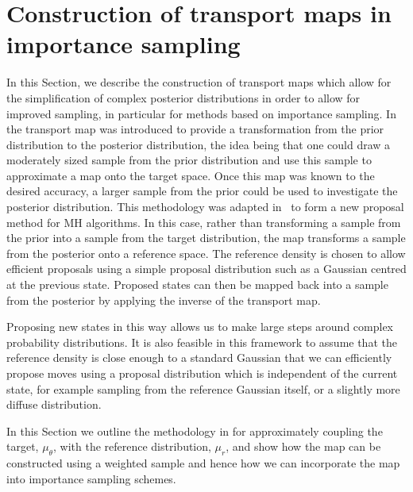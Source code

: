 \documentclass[final]{siamltex}
\begin{document}
\section{Construction of transport maps in importance sampling} \label{sec:map}
In this Section, we describe the construction of transport maps which
allow for the simplification of complex posterior distributions in
order to allow for improved sampling, in particular for methods based
on importance sampling.
In~\cite{el2012bayesian} the transport map was introduced to provide a transformation from the prior
distribution to the posterior distribution, the idea being that one could draw a moderately sized
sample from the prior distribution and use this sample to approximate a map onto the target space.
Once this map was known to the desired accuracy, a larger sample from the prior could be used to
investigate the posterior distribution. This
methodology was adapted in~\cite{parno2014transport} to form a new proposal method for MH
algorithms. In this case, rather than transforming a sample from the prior into a sample from the target
distribution, the map transforms a sample from the posterior onto a reference space.
The reference density is chosen to allow efficient proposals using a simple proposal
distribution such as a Gaussian centred at the previous state. Proposed states can then be mapped back into a sample from the posterior by applying the inverse of the transport map.

Proposing new states in this way allows us to make large steps around complex probability distributions.
It is also feasible in this framework to assume that the reference
density is close enough to a standard Gaussian that we can efficiently
propose moves using a proposal distribution which is independent of
the current state, for example sampling from the reference Gaussian
itself, or a slightly more diffuse distribution.

In this Section we outline the methodology in
\cite{parno2014transport} for approximately coupling the target,
$\mu_{\theta}$, with the reference distribution, $\mu_r$, and
show how the map can be constructed using a weighted sample
and hence how we can incorporate the map into importance sampling schemes.
\end{document}
